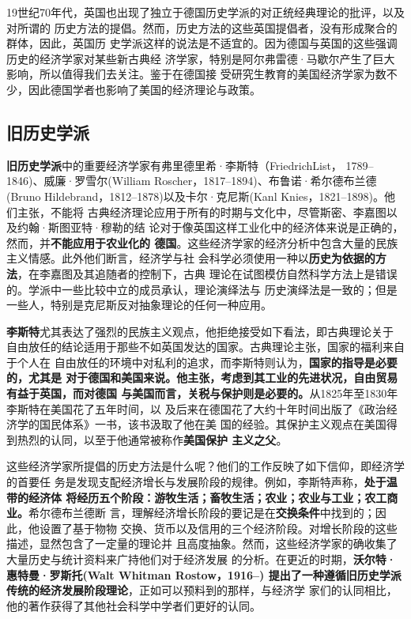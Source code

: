 19世纪70年代，英国也出现了独立于德国历史学派的对正统经典理论的批评，以及对所谓的
历史方法的提倡。然而，历史方法的这些英国提倡者，没有形成聚合的群体，因此，英国历
史学派这样的说法是不适宜的。因为德国与英国的这些强调历史的经济学家对某些新古典经
济学家，特别是阿尔弗雷德·马歇尔产生了巨大影响，所以值得我们去关注。鉴于在德国接
受研究生教育的美国经济学家为数不少，因此德国学者也影响了美国的经济理论与政策。

\subsection{旧历史学派}

\textbf{旧历史学派}中的重要经济学家有弗里德里希·李斯特（FriedrichList，
1789--1846)、威廉·罗雪尔(William Roscher，1817--1894)、布鲁诺·希尔德布兰德(Bruno
Hildebrand，1812--1878)以及卡尔·克尼斯(Kanl Knies，1821--1898)。他们主张，不能将
古典经济理论应用于所有的时期与文化中，尽管斯密、李嘉图以及约翰·斯图亚特·穆勒的结
论对于像英国这样工业化中的经济体来说是正确的，然而，并\textbf{不能应用于农业化的
德国}。这些经济学家的经济分析中包含大量的民族主义情感。此外他们断言，经济学与社
会科学必须使用一种以\textbf{历史为依据的方法}，在李嘉图及其追随者的控制下，古典
理论在试图模仿自然科学方法上是错误的。学派中一些比较中立的成员承认，理论演绎法与
历史演绎法是一致的；但是一些人，特别是克尼斯反对抽象理论的任何一种应用。

\textbf{李斯特}尤其表达了强烈的民族主义观点，他拒绝接受如下看法，即古典理论关于
自由放任的结论适用于那些不如英国发达的国家。古典理论主张，国家的福利来自于个人在
自由放任的环境中对私利的追求，而李斯特则认为，\textbf{国家的指导是必要的，尤其是
对于德国和美国来说。他主张，考虑到其工业的先进状况，自由贸易有益于英国，而对德国
与美国而言，关税与保护则是必要的。}从1825年至1830年李斯特在美国花了五年时间，以
及后来在德国花了大约十年时间出版了《政治经济学的国民体系》一书，该书汲取了他在美
国的经验。其保护主义观点在美国得到热烈的认同，以至于他通常被称作\textbf{美国保护
主义之父}。

这些经济学家所提倡的历史方法是什么呢？他们的工作反映了如下信仰，即经济学的首要任
务是发现支配经济增长与发展阶段的规律。例如，李斯特声称，\textbf{处于温带的经济体
将经历五个阶段：游牧生活；畜牧生活；农业；农业与工业；农工商业。}希尔德布兰德断
言，理解经济增长阶段的要记是在\textbf{交换条件}中找到的；因此，他设置了基于物物
交换、货币以及信用的三个经济阶段。对增长阶段的这些描述，显然包含了一定量的理论并
且高度抽象。然而，这些经济学家的确收集了大量历史与统计资料来广持他们对于经济发展
的分析。在更近的时期，\textbf{沃尔特·惠特曼·罗斯托(Walt Whitman Rostow，1916--)
提出了一种遵循旧历史学派传统的经济发展阶段理论}，正如可以预料到的那样，与经济学
家们的认同相比，他的著作获得了其他社会科学中学者们更好的认同。

